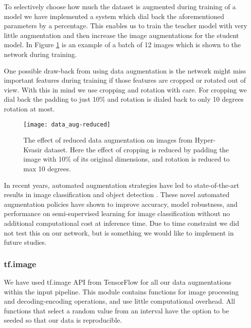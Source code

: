 \documentclass[thesis.tex]{subfiles}
\begin{document}
To selectively choose how much the dataset is augmented during training of a model we have implemented a system which dial back the aforementioned parameters by a percentage. This enables us to train the teacher model with very little augmentation and then increase the image augmentations for the student model. In Figure \ref{fig:data_aug-reduced} is an example of a batch of 12 images which is shown to the network during training.

One possible draw-back from using data augmentation is the network might miss important features during training if those features are cropped or rotated out of view. With this in mind we use cropping and rotation with care. For cropping we dial back the padding to just 10\% and rotation is dialed back to only 10 degrees rotation at most.

\begin{figure} %
  \begin{center}
    \texttt{[image: data\_aug-reduced]}
    \caption[The effect of reduced data augmentation on sample image.]{The effect of reduced data augmentation on images from Hyper-Kvasir dataset. Here the effect of cropping is reduced by padding the image with 10\% of its original dimensions, and rotation is reduced to max 10 degrees.}
    \label{fig:data_aug-reduced}
  \end{center}
\end{figure}

In recent years, automated augmentation strategies have led to state-of-the-art results in image classification and object detection \cite{AutoAugmentLearning19, RandAugmentPractical19}. These novel automated augmentation policies have shown to improve accuracy, model robustness, and performance on semi-supervised learning for image classification without no additional computational cost at inference time. Due to time constraint we did not test this on our network, but is something we would like to implement in future studies.


\subsubsection{tf.image}
We have used tf.image API from TensorFlow for all our data augmentations within the input pipeline. This module contains functions for image processing and decoding-encoding operations, and use little computational overhead. All functions that select a random value from an interval have the option to be seeded so that our data is reproducible.
\end{document}
